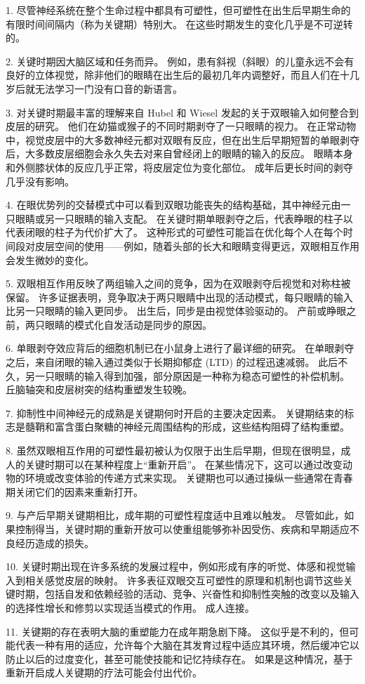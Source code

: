 1. 尽管神经系统在整个生命过程中都具有可塑性，但可塑性在出生后早期生命的有限时间间隔内（称为关键期）特别大。
在这些时期发生的变化几乎是不可逆转的。


2. 关键时期因大脑区域和任务而异。
例如，患有斜视（斜眼）的儿童永远不会有良好的立体视觉，除非他们的眼睛在出生后的最初几年内调整好，而且人们在十几岁后就无法学习一门没有口音的新语言。


3. 对关键时期最丰富的理解来自 Hubel 和 Wiesel 发起的关于双眼输入如何整合到皮层的研究。
他们在幼猫或猴子的不同时期剥夺了一只眼睛的视力。
在正常动物中，视觉皮层中的大多数神经元都对双眼有反应，但在出生后早期短暂的单眼剥夺后，大多数皮层细胞会永久失去对来自曾经闭上的眼睛的输入的反应。
眼睛本身和外侧膝状体的反应几乎正常，将皮层定位为变化部位。
成年后更长时间的剥夺几乎没有影响。


4. 在眼优势列的交替模式中可以看到双眼功能丧失的结构基础，其中神经元由一只眼睛或另一只眼睛的输入支配。
在关键时期单眼剥夺之后，代表睁眼的柱子以代表闭眼的柱子为代价扩大了。
这种形式的可塑性可能旨在优化每个人在每个时间段对皮层空间的使用——例如，随着头部的长大和眼睛变得更远，双眼相互作用会发生微妙的变化。


5. 双眼相互作用反映了两组输入之间的竞争，因为在双眼剥夺后视觉和对称柱被保留。
许多证据表明，竞争取决于两只眼睛中出现的活动模式，每只眼睛的输入比另一只眼睛的输入更同步。
出生后，同步是由视觉体验驱动的。
产前或睁眼之前，两只眼睛的模式化自发活动是同步的原因。


6. 单眼剥夺效应背后的细胞机制已在小鼠身上进行了最详细的研究。
在单眼剥夺之后，来自闭眼的输入通过类似于长期抑郁症 (LTD) 的过程迅速减弱。
此后不久，另一只眼睛的输入得到加强，部分原因是一种称为稳态可塑性的补偿机制。
丘脑轴突和皮层树突的结构重塑发生较晚。


7. 抑制性中间神经元的成熟是关键期何时开启的主要决定因素。
关键期结束的标志是髓鞘和富含蛋白聚糖的神经元周围结构的形成，这些结构阻碍了结构重塑。


8. 虽然双眼相互作用的可塑性最初被认为仅限于出生后早期，但现在很明显，成人的关键时期可以在某种程度上“重新开启”。
在某些情况下，这可以通过改变动物的环境或改变体验的传递方式来实现。
关键期也可以通过操纵一些通常在青春期关闭它们的因素来重新打开。


9. 与产后早期关键期相比，成年期的可塑性程度适中且难以触发。
尽管如此，如果控制得当，关键时期的重新开放可以使重组能够弥补因受伤、疾病和早期适应不良经历造成的损失。


10. 关键时期出现在许多系统的发展过程中，例如形成有序的听觉、体感和视觉输入到相关感觉皮层的映射。
许多表征双眼交互可塑性的原理和机制也调节这些关键时期，包括自发和依赖经验的活动、竞争、兴奋性和抑制性突触的改变以及输入的选择性增长和修剪以实现适当模式的作用。 成人连接。


11. 关键期的存在表明大脑的重塑能力在成年期急剧下降。
这似乎是不利的，但可能代表一种有用的适应，允许每个大脑在其发育过程中适应其环境，然后缓冲它以防止以后的过度变化，甚至可能使技能和记忆持续存在。
如果是这种情况，基于重新开启成人关键期的疗法可能会付出代价。



